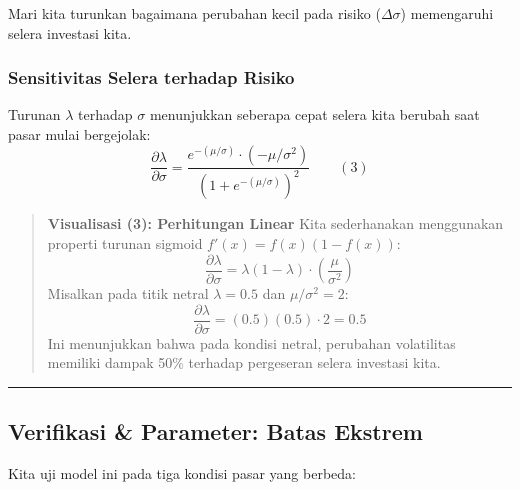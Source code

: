 Mari kita turunkan bagaimana perubahan kecil pada risiko (\(\Delta \sigma\)) memengaruhi selera investasi kita.

\hypertarget{a.-sensitivitas-selera-terhadap-risiko}{%
\subsubsection{Sensitivitas Selera terhadap Risiko}\label{a.-sensitivitas-selera-terhadap-risiko}}

Turunan \(\lambda\) terhadap \(\sigma\) menunjukkan seberapa cepat selera kita berubah saat pasar mulai bergejolak: \[ \frac{\partial \lambda}{\partial \sigma} = \frac{e^{-(\mu/\sigma)} \cdot (-\mu/\sigma^2)}{(1 + e^{-(\mu/\sigma)})^2} \qquad (3) \]

\begin{quote}
\textbf{Visualisasi (3): Perhitungan Linear} Kita sederhanakan menggunakan properti turunan sigmoid \(f'(x) = f(x)(1-f(x))\): \[ \frac{\partial \lambda}{\partial \sigma} = \lambda(1-\lambda) \cdot \left(\frac{\mu}{\sigma^2}\right) \] Misalkan pada titik netral \(\lambda = 0.5\) dan \(\mu/\sigma^2 = 2\): \[ \frac{\partial \lambda}{\partial \sigma} = (0.5)(0.5) \cdot 2 = 0.5 \] Ini menunjukkan bahwa pada kondisi netral, perubahan volatilitas memiliki dampak 50\% terhadap pergeseran selera investasi kita.
\end{quote}

\begin{center}\rule{0.5\linewidth}{0.5pt}\end{center}

\hypertarget{verifikasi-parameter-batas-ekstrem}{%
\subsection{Verifikasi \& Parameter: Batas Ekstrem}\label{verifikasi-parameter-batas-ekstrem}}

Kita uji model ini pada tiga kondisi pasar yang berbeda:

